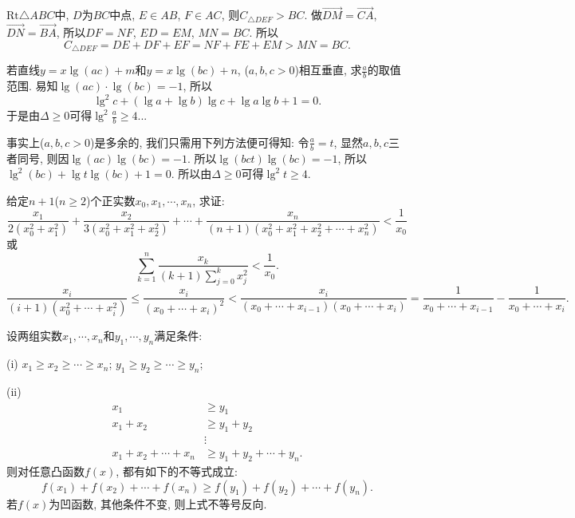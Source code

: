 \bq{}{}
$\mathrm{Rt}\triangle ABC$中, $D$为$BC$中点, $E\in AB$, $F\in AC$,
则$C_{\triangle DEF}>BC$.
\eq
\ba
做$\overrightarrow{DM}=\overrightarrow{CA}$, $\overrightarrow{DN}=\overrightarrow{BA}$,
所以$DF=NF$, $ED=EM$, $MN=BC$. 所以
\[
C_{\triangle DEF}=DE+DF+EF=NF+FE+EM>MN=BC.
\]
\ea

\bq{}{}
若直线$y=x\lg\left(ac\right)+m$和$y=x\lg\left(bc\right)+n$, ($a,b,c>0$)相互垂直,
求$\frac{a}{b}$的取值范围.
\eq
\ba
易知$\lg\left(ac\right)\cdot\lg\left(bc\right)=-1$, 所以
\[
\lg^{2}c+\left(\lg a+\lg b\right)\lg c+\lg a\lg b+1=0.
\]
于是由$\Delta\ge0$可得$\lg^{2}\frac{a}{b}\ge4$...

事实上($a,b,c>0$)是多余的, 我们只需用下列方法便可得知: 令$\frac{a}{b}=t$, 显然$a,b,c$三者同号,
则因$\lg\left(ac\right)\lg\left(bc\right)=-1$. 所以$\lg\left(bct\right)\lg\left(bc\right)=-1$,
所以$\lg^{2}\left(bc\right)+\lg t\lg\left(bc\right)+1=0$. 所以由$\Delta\ge0$可得$\lg^{2}t\ge4$.
\ea

\bq{}{}
给定$n+1$($n\ge2$)个正实数$x_{0},x_{1},\cdots,x_{n}$, 求证:
\[
\frac{x_{1}}{2\left(x_{0}^{2}+x_{1}^{2}\right)}+\frac{x_{2}}{3\left(x_{0}^{2}+x_{1}^{2}+x_{2}^{2}\right)}+\cdots+\frac{x_{n}}{\left(n+1\right)\left(x_{0}^{2}+x_{1}^{2}+x_{2}^{2}+\cdots+x_{n}^{2}\right)}<\frac{1}{x_{0}}
\]
或
\[
\sum_{k=1}^{n}\frac{x_{k}}{\left(k+1\right)\sum_{j=0}^{k}x_{j}^{2}}<\frac{1}{x_{0}}.
\]
\eq
\ba
\[
\frac{x_{i}}{\left(i+1\right)\left(x_{0}^{2}+\cdots+x_{i}^{2}\right)}\le\frac{x_{i}}{\left(x_{0}+\cdots+x_{i}\right)^{2}}<\frac{x_{i}}{\left(x_{0}+\cdots+x_{i-1}\right)\left(x_{0}+\cdots+x_{i}\right)}=\frac{1}{x_{0}+\cdots+x_{i-1}}-\frac{1}{x_{0}+\cdots+x_{i}}.
\]
\ea

设两组实数$x_{1},\cdots,x_{n}$和$y_{1},\cdots,y_{n}$满足条件:

(i) $x_{1}\ge x_{2}\ge\cdots\ge x_{n}$; $y_{1}\ge y_{2}\ge\cdots\ge y_{n}$;

(ii) 
\[
\begin{aligned}
  x_{1} & \ge y_{1}\\
x_{1}+x_{2} & \ge y_{1}+y_{2}\\
& \vdots\\
x_{1}+x_{2}+\cdots+x_{n} & \ge y_{1}+y_{2}+\cdots+y_{n}.
\end{aligned}
\]
则对任意凸函数$f\left(x\right)$, 都有如下的不等式成立:
\[
f\left(x_{1}\right)+f\left(x_{2}\right)+\cdots+f\left(x_{n}\right)\ge f\left(y_{1}\right)+f\left(y_{2}\right)+\cdots+f\left(y_{n}\right).
\]
若$f\left(x\right)$为凹函数, 其他条件不变, 则上式不等号反向.
\eq

